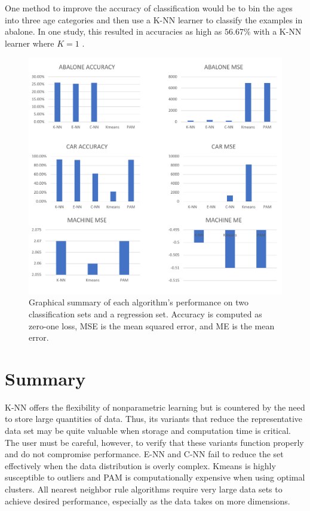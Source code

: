 \documentclass[twoside,11pt]{article}
\begin{document}
One method to improve the accuracy of classification would be to bin the ages into three age categories and then use a K-NN learner to classify the examples in abalone. In one study, this resulted in accuracies as high as $56.67\%$ with a K-NN learner where $K = 1$ \citep{abalone-bad}.

\begin{figure}[h]
	\includegraphics[width=\linewidth]{comparisongraphs.pdf}
	\caption{Graphical summary of each algorithm's performance on two classification sets and a regression set. Accuracy is computed as zero-one loss, MSE is the mean squared error, and ME is the mean error.}
	\label{fig:comparealgs}
\end{figure}


\section{Summary}

K-NN offers the flexibility of nonparametric learning but is countered by the need to store large quantities of data. Thus, its variants that reduce the representative data set may be quite valuable when storage and computation time is critical. The user must be careful, however, to verify that these variants function properly and do not compromise performance. E-NN and C-NN fail to reduce the set effectively when the data distribution is overly complex. Kmeans is highly susceptible to outliers and PAM is computationally expensive when using optimal clusters. All nearest neighbor rule algorithms require very large data sets to achieve desired performance, especially as the data takes on more dimensions.



\end{document}
